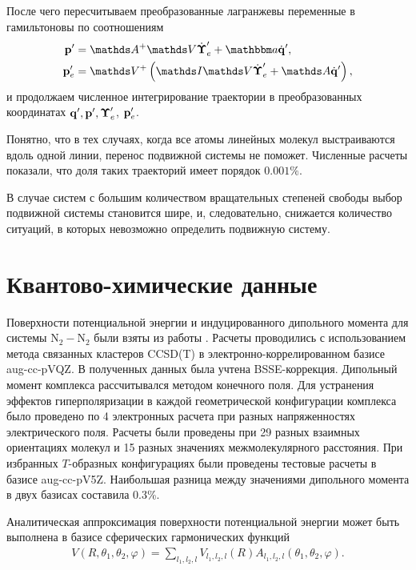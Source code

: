 После чего пересчитываем преобразованные лагранжевы переменные в гамильтоновы по соотношениям
\begin{gather}
    \begin{aligned}
        \mf{p}^\prime &= \bbA^+ \bbV \dot{\boldsymbol{\Upsilon}}_e^\prime + \bba \dot{\mf{q}}^\prime, \\
        \pe^\prime &= \bbV^+ \lb \bbI \bbV \dot{\boldsymbol{\Upsilon}}_e^\prime + \bbA \dot{\mf{q}}^\prime \rb, 
    \end{aligned}
\end{gather}
%
и продолжаем численное интегрирование траектории в преобразованных координатах $\mathbf{q}^\prime, \mathbf{p}^\prime, \boldsymbol{\Upsilon}_e^\prime$, $\mathbf{p}_e^\prime$. \par
Понятно, что в тех случаях, когда все атомы линейных молекул выстраиваются вдоль одной линии, перенос подвижной системы не поможет. Численные расчеты показали, что доля таких траекторий имеет порядок $0.001 \%$. \par
В случае систем с большим количеством вращательных степеней свободы выбор подвижной системы становится шире, и, следовательно, снижается количество ситуаций, в которых невозможно определить подвижную систему. 

\section{Квантово-химические данные} \label{section:quantum-chemistry-data}

Поверхности потенциальной энергии и индуцированного дипольного момента для системы N$_2-$N$_2$ были взяты из работы \cite{karman2015}. Расчеты проводились с использованием метода связанных кластеров CCSD(T) в электронно-коррелированном базисе aug-cc-pVQZ. В полученных данных была учтена BSSE-коррекция. Дипольный момент комплекса рассчитывался методом конечного поля. Для устранения эффектов гиперполяризации в каждой геометрической конфигурации комплекса было проведено по 4 электронных расчета при разных напряженностях электрического поля. Расчеты были проведены при 29 разных взаимных ориентациях молекул и 15 разных значениях межмолекулярного расстояния. При избранных $T$-образных конфигурациях были проведены тестовые расчеты в базисе aug-cc-pV5Z. Наибольшая разница между значениями дипольного момента в двух базисах составила 0.3\%. \par
Аналитическая аппроксимация поверхности потенциальной энергии может быть выполнена в базисе сферических гармонических функций \cite{green1975} 
\begin{gather}
    V(R, \theta_1, \theta_2, \varphi) = \sum_{l_1, l_2, l} V_{l_1, l_2, l}(R) A_{l_1, l_2, l}(\theta_1, \theta_2, \varphi).
\end{gather}

